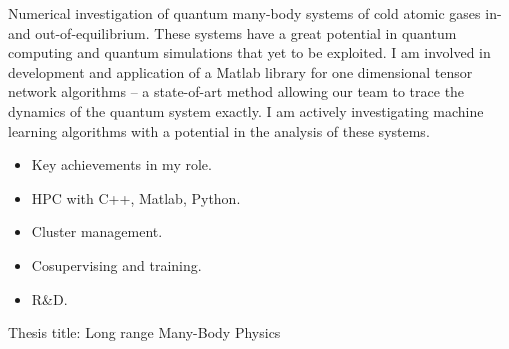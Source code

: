 \documentclass[10pt,a4paper,ragged2e,withhyper]{altacv}
\begin{document}
\begin{paracol}{2}
\begin{itemize}
\end{itemize}



Numerical investigation of quantum many-body systems of cold atomic gases in- and out-of-equilibrium.
These systems have a great potential in quantum computing and quantum simulations that yet to be exploited.
I am involved in development and application of a Matlab library for one dimensional tensor network
algorithms – a state-of-art method allowing our team to trace the dynamics of the quantum system exactly.
I am actively investigating machine learning algorithms with a potential in the analysis of these systems.

\begin{itemize}
    \item Key achievements in my role.
    \item HPC with C++, Matlab, Python.
    \item Cluster management.
    \item Cosupervising and training.
    \item R\&D.
\end{itemize}


Thesis title: Long range Many-Body Physics

\divider


\divider


\divider







\end{paracol}
\end{document}
